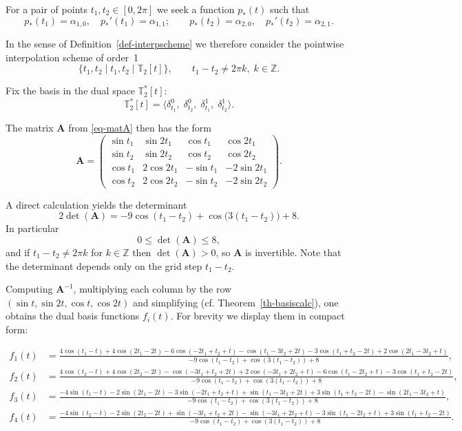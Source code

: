 \documentclass{article}
\theoremstyle{definition}
\theoremstyle{definition}
\numberwithin{figure}{section}
\newcommand{\1}{\mathbf{1}}
\begin{document}
For a pair of points \(t_1,t_2\in[0,2\pi]\) we seek a function \(p_*(t)\) such that
\[
    p_*(t_1)=\alpha_{1,0},\quad p_*'(t_1)=\alpha_{1,1};\qquad
    p_*(t_2)=\alpha_{2,0},\quad p_*'(t_2)=\alpha_{2,1}.
\]

In the sense of Definition~\ref{def-interpscheme} we therefore consider the pointwise interpolation scheme of order~1
\[
    \{t_1,t_2\mid t_1,t_2\mid \mathbb{T}_2[t]\},\qquad t_1-t_2\neq 2\pi k,\; k\in\mathbb{Z}.
\]

Fix the basis in the dual space \(\mathbb{T}_2^*[t]\):
\[
    \mathbb{T}_2^*[t] = \langle \delta^0_{t_1},\; \delta^0_{t_2},\; \delta^1_{t_1},\; \delta^1_{t_2}\rangle.
\]

The matrix \(\mathbf{A}\) from \eqref{eq-matA} then has the form
\[
   \mathbf{A} =
   \begin{pmatrix}
        \sin t_1 & \sin 2t_1 & \cos t_1 & \cos 2t_1 \\
        \sin t_2 & \sin 2t_2 & \cos t_2 & \cos 2t_2 \\
        \cos t_1 & 2\cos 2t_1 & -\sin t_1 & -2\sin 2t_1 \\
        \cos t_2 & 2\cos 2t_2 & -\sin t_2 & -2\sin 2t_2
   \end{pmatrix}.
\]

A direct calculation yields the determinant
\[
    2\det(\mathbf{A}) = -9\cos(t_1-t_2) + \cos\bigl(3(t_1-t_2)\bigr) + 8.
\]
In particular
\[
    0 \le \det(\mathbf{A}) \le 8,
\]
and if \(t_1-t_2\neq 2\pi k\) for \(k\in\mathbb{Z}\) then \(\det(\mathbf{A})>0\), so \(\mathbf{A}\) is invertible. Note that the determinant depends only on the grid step \(t_1-t_2\).

Computing \(\mathbf{A}^{-1}\), multiplying each column by the row \((\sin t,\sin 2t,\cos t,\cos 2t)\) and simplifying (cf. Theorem~\ref{th-basiscalc}), one obtains the dual basis functions \(f_i(t)\). For brevity we display them in compact form:

{\scriptsize
\begin{align*}
f_1(t) &= 
\frac{4\cos(t_1 - t) + 4\cos(2t_1 - 2t) - 6\cos(-2t_1 + t_2 + t) - \cos(t_1 - 3t_2 + 2t) - 3\cos(t_1 + t_2 - 2t) + 2\cos(2t_1 - 3t_2 + t)}{-9\cos(t_1 - t_2) + \cos(3(t_1 - t_2)) + 8}, \\[6pt]
f_2(t) &= \frac{4\cos(t_2 - t) + 4\cos(2t_2 - 2t) - \cos(-3t_1 + t_2 + 2t) + 2\cos(-3t_1 + 2t_2 + t) - 6\cos(t_1 - 2t_2 + t) - 3\cos(t_1 + t_2 - 2t)}{-9\cos(t_1 - t_2) + \cos(3(t_1 - t_2)) + 8}, \\[6pt]
f_3(t) &= \frac{-4\sin(t_1 - t) - 2\sin(2t_1 - 2t) - 3\sin(-2t_1 + t_2 + t) + \sin(t_1 - 3t_2 + 2t) + 3\sin(t_1 + t_2 - 2t) - \sin(2t_1 - 3t_2 + t)}{-9\cos(t_1 - t_2) + \cos(3(t_1 - t_2)) + 8}, \\[6pt]
f_4(t) &= \frac{-4\sin(t_2 - t) - 2\sin(2t_2 - 2t) + \sin(-3t_1 + t_2 + 2t) - \sin(-3t_1 + 2t_2 + t) - 3\sin(t_1 - 2t_2 + t) + 3\sin(t_1 + t_2 - 2t)}{-9\cos(t_1 - t_2) + \cos(3(t_1 - t_2)) + 8}.
\end{align*}
}
\end{document}
